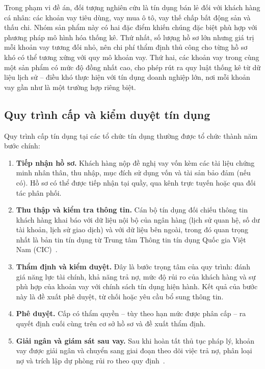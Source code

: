 Trong phạm vi đề án, đối tượng nghiên cứu là tín dụng bán lẻ đối với khách hàng
cá nhân: các khoản vay tiêu dùng, vay mua ô tô, vay thế chấp bất động sản và thấu
chi. Nhóm sản phẩm này có hai đặc điểm khiến chúng đặc biệt phù hợp với phương
pháp mô hình hóa thống kê. Thứ nhất, số lượng hồ sơ lớn nhưng giá trị mỗi khoản
vay tương đối nhỏ, nên chi phí thẩm định thủ công cho từng hồ sơ khó có thể tương
xứng với quy mô khoản vay. Thứ hai, các khoản vay trong cùng một sản phẩm có mức
độ đồng nhất cao, cho phép rút ra quy luật thống kê từ dữ liệu lịch sử -- điều
khó thực hiện với tín dụng doanh nghiệp lớn, nơi mỗi khoản vay gần như là một
trường hợp riêng biệt.

\subsection{Quy trình cấp và kiểm duyệt tín dụng}
\label{subsec:quy-trinh-kiem-duyet}

Quy trình cấp tín dụng tại các tổ chức tín dụng thường được tổ chức thành năm
bước chính:

\begin{enumerate}[label=(\arabic*)]
  \item \textbf{Tiếp nhận hồ sơ.} Khách hàng nộp đề nghị vay vốn kèm các tài liệu
  chứng minh nhân thân, thu nhập, mục đích sử dụng vốn và tài sản bảo đảm (nếu
  có). Hồ sơ có thể được tiếp nhận tại quầy, qua kênh trực tuyến hoặc qua đối tác
  phân phối.

  \item \textbf{Thu thập và kiểm tra thông tin.} Cán bộ tín dụng đối chiếu thông
  tin khách hàng khai báo với dữ liệu nội bộ của ngân hàng (lịch sử quan hệ, số
  dư tài khoản, lịch sử giao dịch) và với dữ liệu bên ngoài, trong đó quan trọng
  nhất là bản tin tín dụng từ Trung tâm Thông tin tín dụng Quốc gia Việt Nam
  (CIC)~\cite{tt15}.

  \item \textbf{Thẩm định và kiểm duyệt.} Đây là bước trọng tâm của quy trình:
  đánh giá năng lực tài chính, khả năng trả nợ, mức độ rủi ro của khách hàng và
  sự phù hợp của khoản vay với chính sách tín dụng hiện hành. Kết quả của bước
  này là đề xuất phê duyệt, từ chối hoặc yêu cầu bổ sung thông tin.

  \item \textbf{Phê duyệt.} Cấp có thẩm quyền -- tùy theo hạn mức được phân cấp
  -- ra quyết định cuối cùng trên cơ sở hồ sơ và đề xuất thẩm định.

  \item \textbf{Giải ngân và giám sát sau vay.} Sau khi hoàn tất thủ tục pháp lý,
  khoản vay được giải ngân và chuyển sang giai đoạn theo dõi việc trả nợ, phân
  loại nợ và trích lập dự phòng rủi ro theo quy định~\cite{tt11}.
\end{enumerate}

